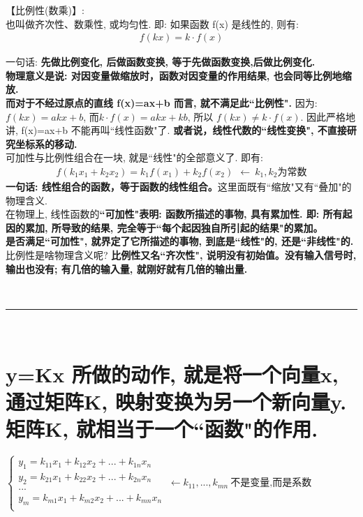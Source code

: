 \documentclass[UTF8]{ctexart}
\begin{document}
【比例性(数乘)】:\\
也叫做齐次性、数乘性, 或均匀性. 即: 如果函数 f(x) 是线性的, 则有:
\begin{align*}
	\boxed{
	f(kx) = k \cdot f(x)	
	}
\end{align*}

一句话: \textbf{先做比例变化, 后做函数变换, 等于先做函数变换,后做比例变化.}\\
\textbf{物理意义是说: 对因变量做缩放时，函数对因变量的作用结果, 也会同等比例地缩放.} \\

\textbf{而对于不经过原点的直线 f(x)=ax+b 而言, 就不满足此``比例性".} 因为: $f(kx) = akx+b$, 而$k\cdot f(x)=akx+kb$, 所以 $f(kx) \neq k \cdot f(x)$. 因此严格地讲, f(x)=ax+b 不能再叫``线性函数"了. \textbf{或者说，线性代数的``线性变换", 不直接研究坐标系的移动.}\\

可加性与比例性组合在一块, 就是``线性"的全部意义了. 即有:
\begin{align*}
f\left( k_1x_1+k_2x_2 \right) =k_1f\left( x_1 \right) +k_2f\left( x_2 \right) \ \ ←\ k_1,k_2\text{为常数}
\end{align*}
\textbf{一句话: 线性组合的函数，等于函数的线性组合。}这里面既有``缩放"又有``叠加"的物理含义.\\

在物理上, 线性函数的\textbf{``可加性"表明: 函数所描述的事物, 具有累加性. 即: 所有起因的累加, 所导致的结果, 完全等于``每个起因独自所引起的结果"的累加。}\\
\textbf{是否满足``可加性", 就界定了它所描述的事物, 到底是``线性"的, 还是``非线性"的.}\\


比例性是啥物理含义呢? \textbf{比例性又名``齐次性", 说明没有初始值。没有输入信号时, 输出也没有; 有几倍的输入量, 就刚好就有几倍的输出量.}


~\\
\hrule
~\\


\section{y=Kx 所做的动作, 就是将一个向量x, 通过矩阵K, 映射变换为另一个新向量y. 矩阵K, 就相当于一个``函数"的作用.}

$
\left\{ \begin{array}{l}
	y_1=k_{11}x_1+k_{12}x_2+...+k_{1n}x_n\\
	y_2=k_{21}x_1+k_{22}x_2+...+k_{2n}x_n\\
	...\\
	y_m=k_{m1}x_1+k_{m2}x_2+...+k_{mn}x_n\\
\end{array} \right. \ ←k_{11},...,k_{mn}\ \text{不是变量,而是系数}
$\\
\end{document}
